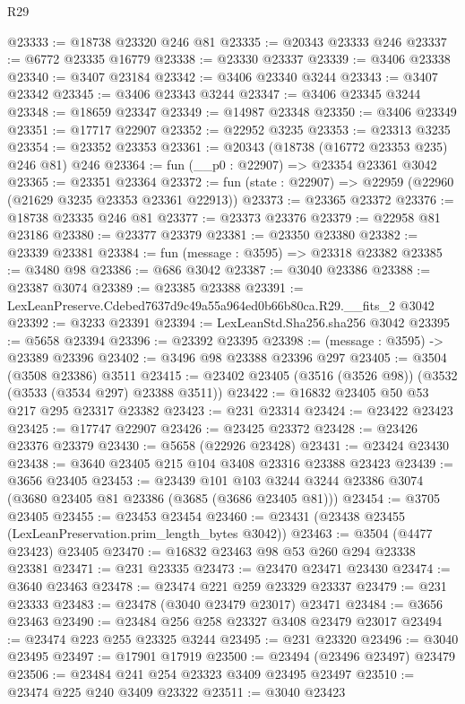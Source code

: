 \begin{lexlean}{R29}
\begin{coremodule}
@23333 := @18738 @23320 @246 @81
@23335 := @20343 @23333 @246
@23337 := @6772 @23335 @16779
@23338 := @23330 @23337
@23339 := @3406 @23338
@23340 := @3407 @23184
@23342 := @3406 @23340 @3244
@23343 := @3407 @23342
@23345 := @3406 @23343 @3244
@23347 := @3406 @23345 @3244
@23348 := @18659 @23347
@23349 := @14987 @23348
@23350 := @3406 @23349
@23351 := @17717 @22907
@23352 := @22952 @3235
@23353 := @23313 @3235
@23354 := @23352 @23353
@23361 := @20343 (@18738 (@16772 @23353 @235) @246 @81) @246
@23364 := fun (__p0 : @22907) => @23354 @23361 @3042
@23365 := @23351 @23364
@23372 := fun (state : @22907) => @22959 (@22960 (@21629 @3235 @23353 @23361 @22913))
@23373 := @23365 @23372
@23376 := @18738 @23335 @246 @81
@23377 := @23373 @23376
@23379 := @22958 @81 @23186
@23380 := @23377 @23379
@23381 := @23350 @23380
@23382 := @23339 @23381
@23384 := fun (message : @3595) => @23318 @23382
@23385 := @3480 @98
@23386 := @686 @3042
@23387 := @3040 @23386
@23388 := @23387 @3074
@23389 := @23385 @23388
@23391 := LexLeanPreserve.Cdebed7637d9c49a55a964ed0b66b80ca.R29.__fits_2 @3042
@23392 := @3233 @23391
@23394 := LexLeanStd.Sha256.sha256 @3042
@23395 := @5658 @23394
@23396 := @23392 @23395
@23398 := (message : @3595) -> @23389 @23396
@23402 := @3496 @98 @23388 @23396 @297
@23405 := @3504 (@3508 @23386) @3511
@23415 := @23402 @23405 (@3516 (@3526 @98)) (@3532 (@3533 (@3534 @297) @23388 @3511))
@23422 := @16832 @23405 @50 @53 @217 @295 @23317 @23382
@23423 := @231 @23314
@23424 := @23422 @23423
@23425 := @17747 @22907
@23426 := @23425 @23372
@23428 := @23426 @23376 @23379
@23430 := @5658 (@22926 @23428)
@23431 := @23424 @23430
@23438 := @3640 @23405 @215 @104 @3408 @23316 @23388 @23423
@23439 := @3656 @23405
@23453 := @23439
    @101
    @103
    @3244
    @3244
    @23386
    @3074
    (@3680 @23405 @81 @23386 (@3685 (@3686 @23405 @81)))
@23454 := @3705 @23405
@23455 := @23453 @23454
@23460 := @23431 (@23438 @23455 (LexLeanPreservation.prim_length_bytes @3042))
@23463 := @3504 (@4477 @23423) @23405
@23470 := @16832 @23463 @98 @53 @260 @294 @23338 @23381
@23471 := @231 @23335
@23473 := @23470 @23471 @23430
@23474 := @3640 @23463
@23478 := @23474 @221 @259 @23329 @23337
@23479 := @231 @23333
@23483 := @23478 (@3040 @23479 @23017) @23471
@23484 := @3656 @23463
@23490 := @23484 @256 @258 @23327 @3408 @23479 @23017
@23494 := @23474 @223 @255 @23325 @3244
@23495 := @231 @23320
@23496 := @3040 @23495
@23497 := @17901 @17919
@23500 := @23494 (@23496 @23497) @23479
@23506 := @23484 @241 @254 @23323 @3409 @23495 @23497
@23510 := @23474 @225 @240 @3409 @23322
@23511 := @3040 @23423

\end{coremodule}
\end{lexlean}
